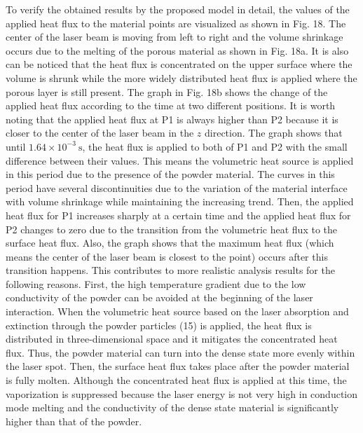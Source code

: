\documentclass[10pt]{article}
\begin{document}
To verify the obtained results by the proposed model in detail, the values of the applied heat flux to the material points are visualized as shown in Fig. 18. The center of the laser beam is moving from left to right and the volume shrinkage occurs due to the melting of the porous material as shown in Fig. 18a. It is also can be noticed that the heat flux is concentrated on the upper surface where the volume is shrunk while the more widely distributed heat flux is applied where the porous layer is still present. The graph in Fig. 18b shows the change of the applied heat flux according to the time at two different positions. It is worth noting that the applied heat flux at P1 is always higher than P2 because it is closer to the center of the laser beam in the $z$ direction. The graph shows that until $1.64 \times 10^{-3} \mathrm{~s}$, the heat flux is applied to both of P1 and P2 with the small difference between their values. This means the volumetric heat source is applied in this period due to the presence of the powder material. The curves in this period have several discontinuities due to the variation of the material interface with volume shrinkage while maintaining the increasing trend. Then, the applied heat flux for P1 increases sharply at a certain time and the applied heat flux for P2 changes to zero due to the transition from the volumetric heat flux to the surface heat flux. Also, the graph shows that the maximum heat flux (which means the center of the laser beam is closest to the point) occurs after this transition happens. This contributes to more realistic analysis results for the following reasons. First, the high temperature gradient due to the low conductivity of the powder can be avoided at the beginning of the laser interaction. When the volumetric heat source based on the laser absorption and extinction through the powder particles (15) is applied, the heat flux is distributed in three-dimensional space and it mitigates the concentrated heat flux. Thus, the powder material can turn into the dense state more evenly within the laser spot. Then, the surface heat flux takes place after the powder material is fully molten. Although the concentrated heat flux is applied at this time, the vaporization is suppressed because the laser energy is not very high in conduction mode melting and the conductivity of the dense state material is significantly higher than that of the powder.
\end{document}
